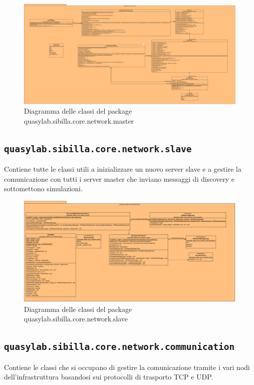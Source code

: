 \begin{figure}[H]
    \includegraphics[width=\linewidth]{images/quasylab.sibilla.core.network.master.png}
    \captionsetup{justification=centering}
    \caption{Diagramma delle classi del package quasylab.sibilla.core.network.master}
  \end{figure}

\subsection{\texttt{quasylab.sibilla.core.network.slave}} Contiene tutte le classi utili a inizializzare un nuovo server slave e a gestire la comunicazione con tutti i server master che inviano messaggi di discovery e sottomettono simulazioni.

\begin{figure}[H]
    \includegraphics[width=\linewidth]{images/quasylab.sibilla.core.network.slave.png}
    \captionsetup{justification=centering}
    \caption{Diagramma delle classi del package quasylab.sibilla.core.network.slave}
  \end{figure}

\subsection{\texttt{quasylab.sibilla.core.network.communication}} Contiene le classi che si occupano di gestire la comunicazione tramite i vari nodi dell’infrastruttura basandosi sui protocolli di trasporto TCP e UDP. 

